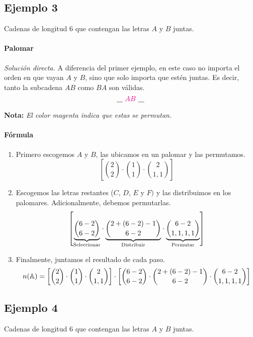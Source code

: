 \subsection{Ejemplo 3}
Cadenas de longitud 6 que contengan las letras $A$ y $B$ juntas.

\paragraph{Palomar}
\textit{Solución directa.}
A diferencia del primer ejemplo, en este caso no importa el orden en que vayan $A$ y $B$, sino que solo importa que estén juntas. Es decir, tanto la subcadena $AB$ como $BA$ son válidas.
\begin{equation*}
~\underline{\hspace{0.3cm}}~ {\color{magenta} AB} ~\underline{\hspace{0.3cm}}~
\end{equation*}

\textbf{Nota:} \textit{El color magenta indica que estas se permutan.}

\paragraph{Fórmula}

\begin{enumerate}
	\item Primero escogemos $A$ y $B$, las ubicamos en un palomar {\color{magenta} y las permutamos}.
	$$\left[\binom{2}{2}\cdot\binom{1}{1}\cdot\binom{2}{1,1}\right]$$
	\item Escogemos las letras restantes ($C$, $D$, $E$ y $F)$ y las distribuimos en los palomares. Adicionalmente, debemos permutarlas.
	\begin{align*}
	\left[\underset{\text{Seleccionar}}{\underbrace{\binom{6-2}{6-2}}}\cdot\underset{\text{Distribuir}}{\underbrace{\binom{2+(6-2)-1}{6-2}}}\cdot\underset{\text{Permutar}}{\underbrace{\binom{6-2}{1,1,1,1}}}\right]
	\end{align*}
	\item Finalmente, juntamos el resultado de cada paso.
	\begin{equation*}
	n(\mathbb{A})=\left[\binom{2}{2}\cdot\binom{1}{1}\cdot\binom{2}{1,1}\right]
	\cdot
	\left[\binom{6-2}{6-2}\cdot\binom{2+(6-2)-1}{6-2}\cdot\binom{6-2}{1,1,1,1}\right]
	\end{equation*}
\end{enumerate}
\subsection{Ejemplo 4}
Cadenas de longitud 6 que contengan las letras $A$ y $B$ juntas.

